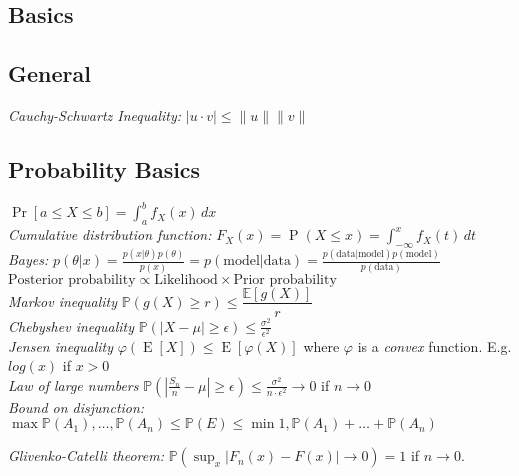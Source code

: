 \documentclass[9pt,parskip]{scrartcl}
\begin{document}
\begin{multicols*}{4}

%
%


\section*{Basics}
\subsection*{General}
\textit{Cauchy-Schwartz Inequality: }$|u\cdot v|\le \|u\|\|v\|$
\subsection*{Probability Basics}
$\Pr[a\leq X\leq b]=\int _{a}^{b}f_{X}(x)\,dx$ \\
\textit{Cumulative distribution function: } $F_{X}(x)=\operatorname {P} (X\leq x) =\int _{-\infty }^{x}f_{X}(t)\,dt$ \\
\textit{Bayes: } $p(\theta |x)={\frac {p(x|\theta )p(\theta )}{p(x)}} = p(\text{model} | \text{data} )={\frac {p( \text{data}|\text{model} )p(\text{model})}{p(\text{data})}} $ \\
$\text{Posterior probability} \propto \text{Likelihood} \times \text{Prior probability}$ \\
\textit{Markov inequality} $\mathbb{P}(g(X) \geq r) \leq \dfrac{\mathbb{E}[g(X)]}{r}$ \\
\textit{Chebyshev inequality} $\mathbb{P}(|X-\mu|\geq \epsilon) \leq \frac{\sigma^2}{\epsilon^2}$ \\
\textit{Jensen inequality} $\varphi \left(\operatorname {E} [X]\right)\leq \operatorname {E} \left[\varphi (X)\right]$ where $\varphi$ is a \textit{convex} function. E.g. $log(x)$ if $x > 0$ \\
\textit{Law of large numbers} $\mathbb{P}(|\frac{S_n}{n}-\mu|\geq \epsilon) \leq \frac{\sigma^2}{n \cdot \epsilon^2} \to 0$ if $n \to 0$ \\
\textit{Bound on disjunction: }$\max{\mathbb{P}(A_1), \dots , \mathbb{P}(A_n)} \leq \mathbb{P}(E) \leq \min{1, \mathbb{P}(A_1) + \dots + \mathbb{P}(A_n)}$

\textit{Glivenko-Catelli theorem: }$\mathbb{P}(\sup_{x} | F_{n}(x) - F(x)| \to 0)=1$ if $n \to 0$.

\end{multicols*}
\end{document}
